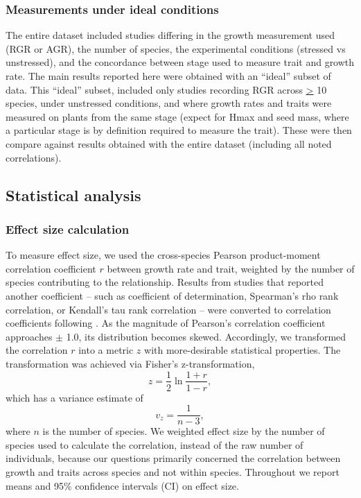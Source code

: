 \documentclass[a4paper,11pt]{article}
\begin{document}
\subsubsection*{Measurements under ideal conditions}\label{ideal-vs-entire-dataset}

The entire dataset included studies differing in the growth measurement used (RGR or AGR), the number of species, the experimental conditions (stressed vs unstressed), and the concordance between stage used to measure trait and growth rate. The main results reported here were obtained with an ``ideal'' subset of data. This ``ideal'' subset, included only studies recording RGR across \underline{\textgreater} 10 species, under unstressed conditions, and where growth rates and traits were measured on plants from the same stage (expect for Hmax and seed mass, where a particular stage is by definition required to measure the trait). These were then compare against results obtained with the entire dataset (including all noted correlations). 

\subsection*{Statistical analysis}\label{statistical-analyses}

\subsubsection*{Effect size calculation}\label{effect-size}

To measure effect size, we used the cross-species Pearson product-moment correlation coefficient $r$ between growth rate and trait, weighted by the number of species contributing to the relationship. Results from studies that reported another coefficient -- such as coefficient of determination, Spearman's rho rank correlation, or Kendall's tau rank correlation -- were converted to correlation coefficients following \citet{Lajeunesse:2013tm}. As the magnitude of Pearson's correlation coefficient approaches $\pm$ 1.0, its distribution becomes skewed. Accordingly, we transformed the correlation $r$ into a metric $z$ with more-desirable statistical properties. The transformation was achieved via Fisher's z-transformation,
\[ z = \frac{1}{2} \ln \frac{1+r}{1-r},\]
which has a variance estimate of
\[ v_z= \frac{1}{n-3},\]
where $n$ is the number of species. We weighted effect size by the number of species used to calculate the correlation, instead of the raw number of individuals, because our questions primarily concerned the correlation between growth and traits across species and not within species. Throughout we report means and 95\% confidence intervals (CI) on effect size.
\end{document}
